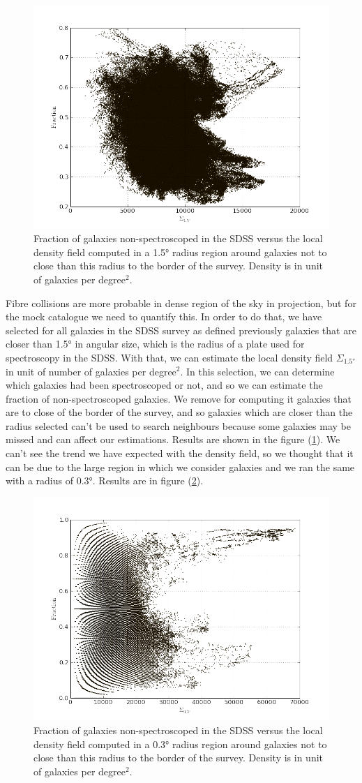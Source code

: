 \begin{figure}[htb]
    \centering
    \includegraphics[width=0.6\linewidth]{figures/sdss/FracNonSpec.png}
    \caption{Fraction of galaxies non-spectroscoped in the SDSS versus the local density field computed in a
    1.5° radius region around galaxies not to close than this radius to the border of the survey. Density is in unit of galaxies
    per degree$^2$.}
\label{fig:fracnonspec}
\end{figure}
%
Fibre collisions are more probable in dense region of the sky in projection,
but for the mock catalogue we need to quantify this. In order to do that, we
have selected for all galaxies in the SDSS survey as defined previously
galaxies that are closer than 1.5° in angular size, which is the radius
of a plate used for spectroscopy in the SDSS\@. With that, we can estimate the
local density field $\Sigma_{1.5°}$ in unit of number of galaxies per
degree$^2$. In this selection, we can determine which galaxies had been
spectroscoped or not, and so we can estimate the fraction of non-spectroscoped
galaxies. We remove for computing it galaxies that are to close of the border
of the survey, and so galaxies which are closer than the radius selected can't
be used to search neighbours because some galaxies may be missed and can affect
our estimations. Results are shown in the figure (\ref{fig:fracnonspec}). We
can't see the trend we have expected with the density field, so we thought that
it can be due to the large region in which we consider galaxies and we ran the
same with a radius of 0.3°. Results are in figure
(\ref{fig:fracnonspec0.3}).
%
\begin{figure}[htb]
    \centering
    \includegraphics[width=0.6\linewidth]{figures/sdss/FracNonSpec03.png}
    \caption{Fraction of galaxies non-spectroscoped in the SDSS versus the
    local density field computed in a 0.3° radius region around galaxies not to
close than this radius to the border of the survey. Density is in unit of
galaxies per degree$^2$.}
\label{fig:fracnonspec0.3}
\end{figure}

